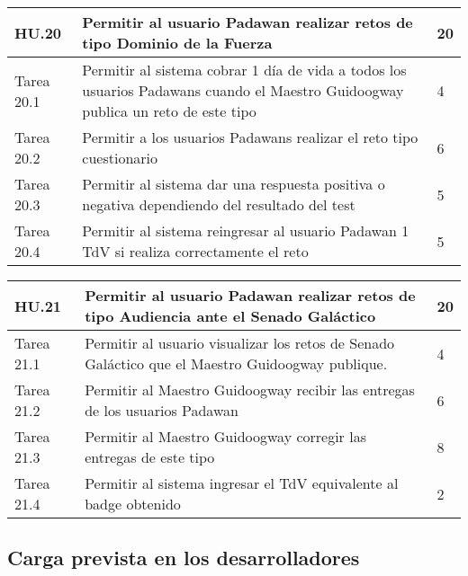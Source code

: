 \begin{table}[h]
	\centering
	\begin{tabular}{| p{2.3cm} | p{6.7cm} | p{2cm} |}
		\rowcolor[HTML]{329A9D} 
		{\color[HTML]{FFFFFF} \textbf{HU.20}} & {\color[HTML]{FFFFFF} \textbf{Permitir al usuario Padawan realizar retos de tipo Dominio de la Fuerza}} & {\color[HTML]{FFFFFF} \textbf{20}}  \\ \hline
		Tarea 20.1 & Permitir al sistema cobrar 1 día de vida a todos los usuarios Padawans cuando el Maestro Guidoogway publica un reto de este tipo & 4 \\ \hline
		Tarea 20.2 & Permitir a los usuarios Padawans realizar el reto tipo cuestionario & 6 \\ \hline
		Tarea 20.3 & Permitir al sistema dar una respuesta positiva o negativa dependiendo del resultado del test & 5 \\ \hline
		Tarea 20.4 & Permitir al sistema reingresar al usuario Padawan 1 TdV si realiza correctamente el reto & 5 \\ \hline
	\end{tabular}
\end{table}

\begin{table}[h]
	\centering
	\begin{tabular}{| p{2.3cm} | p{6.7cm} | p{2cm} |}
		\rowcolor[HTML]{329A9D} 
		{\color[HTML]{FFFFFF} \textbf{HU.21}} & {\color[HTML]{FFFFFF} \textbf{Permitir al usuario Padawan realizar retos de tipo Audiencia ante el Senado Galáctico}} & {\color[HTML]{FFFFFF} \textbf{20}}  \\ \hline
		Tarea 21.1 & Permitir al usuario visualizar los retos de Senado Galáctico que el Maestro Guidoogway publique. & 4 \\ \hline
		Tarea 21.2 & Permitir al Maestro Guidoogway recibir las entregas de los usuarios Padawan & 6 \\ \hline
		Tarea 21.3 & Permitir al Maestro Guidoogway corregir las entregas de este tipo & 8 \\ \hline
		Tarea 21.4 & Permitir al sistema ingresar el TdV equivalente al badge obtenido & 2 \\ \hline
	\end{tabular}
\end{table}

\subsection{Carga prevista en los desarrolladores}

